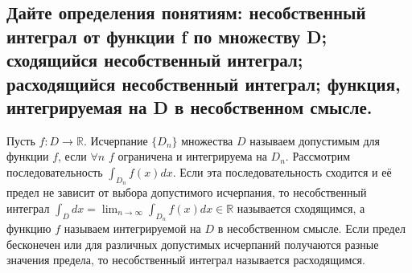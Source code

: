 
\subsection{Дайте определения понятиям: несобственный интеграл от функции f по множеству D; сходящийся несобственный интеграл; расходящийся несобственный интеграл; функция, интегрируемая на D в несобственном смысле.}
Пусть $f: D \rightarrow \mathbb{R}$. Исчерпание $\{D_n\}$ множества $D$ называем допустимым для функции $f$, если $\forall n$ $f$ ограничена и интегрируема на $D_n$. Рассмотрим последовательность $\int_{D_n} f(x) dx$. Если эта последовательность сходится и её предел не зависит от выбора допустимого исчерпания, то несобственный интеграл $\int_{D} dx = \lim_{n \to \infty} \int_{D_n} f(x) dx \in \mathbb{R}$ называется сходящимся, а функцию $f$ называем интегрируемой на $D$ в несобственном смысле. Если предел бесконечен или для различных допустимых исчерпаний получаются разные значения предела, то несобственный интеграл называется расходящимся. 
